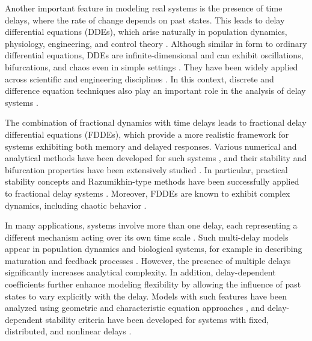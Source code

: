 \documentclass[11pt]{article}
\theoremstyle{remark}
\begin{document}
Another important feature in modeling real systems is the presence of time delays, where the rate of change depends on past states. This leads to delay differential equations (DDEs), which arise naturally in population dynamics, physiology, engineering, and control theory \cite{hale2013introduction,erneux2009applied,kuang1993delay}. Although similar in form to ordinary differential equations, DDEs are infinite-dimensional and can exhibit oscillations, bifurcations, and chaos even in simple settings \cite{hale2013introduction,sprott2007simple,ruiz2013chaos,insperger2011semi}. They have been widely applied across scientific and engineering disciplines \cite{michiels2010control,gumussoy2014computer,agarwal2016stability}. In this context, discrete and difference equation techniques also play an important role in the analysis of delay systems \cite{agarwal2000difference}.

The combination of fractional dynamics with time delays leads to fractional delay differential equations (FDDEs), which provide a more realistic framework for systems exhibiting both memory and delayed responses. Various numerical and analytical methods have been developed for such systems \cite{bhalekar2011predictor,daftardar2014new}, and their stability and bifurcation properties have been extensively studied \cite{bhalekar2016stability,bhalekar2011fractional,gupta2024fractional,bhalekar2022stability}. In particular, practical stability concepts and Razumikhin-type methods have been successfully applied to fractional delay systems \cite{agarwal2021practical,agarwal2022generalized}. Moreover, FDDEs are known to exhibit complex dynamics, including chaotic behavior \cite{bhalekar2012dynamical,daftardar2012dynamics}.

In many applications, systems involve more than one delay, each representing a different mechanism acting over its own time scale \cite{gu2003stability,niculescu2002delay}. Such multi-delay models appear in population dynamics and biological systems, for example in describing maturation and feedback processes \cite{braddock1983two,piotrowska2008hopf,boullu2020stability}. However, the presence of multiple delays significantly increases analytical complexity. In addition, delay-dependent coefficients further enhance modeling flexibility by allowing the influence of past states to vary explicitly with the delay. Models with such features have been analyzed using geometric and characteristic equation approaches \cite{an2019geometric}, and delay-dependent stability criteria have been developed for systems with fixed, distributed, and nonlinear delays \cite{huang2004analysis,fei2017delay}.
\end{document}
